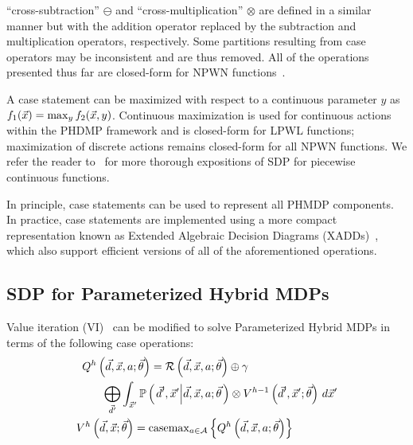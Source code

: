 ``cross-subtraction'' {\footnotesize$\ominus$} and ``cross-multiplication'' {\footnotesize$\otimes$} are defined in a similar manner but with the addition operator replaced by the subtraction and multiplication operators, respectively. Some partitions resulting from case operators may be inconsistent and are thus removed. All of the operations presented thus far are closed-form for NPWN functions~\cite{Sanner_UAI_2011}.

A case statement can be maximized with respect to a continuous parameter {\footnotesize$y$} as {\footnotesize $ f_1(\vec{x}) = \contmax_{y}f_2(\vec{x}, y) $}. Continuous maximization is used for continuous actions within the PHDMP framework and is closed-form for LPWL functions; maximization of discrete actions remains closed-form for all NPWN functions. We refer the reader to~\cite{Sanner_UAI_2011,Zamani_AAAI_2012} for more thorough expositions of SDP for piecewise continuous functions.

In principle, case statements can be used to represent all PHMDP components. In practice, case statements are implemented using a more compact representation known as Extended Algebraic Decision Diagrams (XADDs)~\cite{Sanner_UAI_2011}, which also support efficient versions of all of the aforementioned operations. 

\subsection{SDP for Parameterized Hybrid MDPs}

Value iteration (VI)~\cite{Bellman_PU_1957} can be modified to solve Parameterized Hybrid MDPs in terms of the following case operations:
{\footnotesize 
    \abovedisplayskip=0pt
    \belowdisplayskip=0pt
    \begin{align}
        Q^{h} \left( \vec{d}, \vec{x}, a; \vec{\theta} \right) = \mathcal{R} \left( \vec{d}, \vec{x}, a; \vec{\theta} \right) \oplus \gamma \qquad \qquad \qquad \qquad &  \nonumber \\ 
        \bigoplus_{\vec{d}'} \int_{\vec{x}'} \mathbb{P}\left({ \left. \vec{d}', \vec{x}' \middle| \vec{d}, \vec{x}, a; \vec{\theta} \right.}\right) \otimes V^{h-1} \left( \vec{d}', \vec{x}'; \vec{\theta} \right) \, d\vec{x}' & \label{eq:vi_sdp_qfunc} \\
        V^{h}\left( \vec{d}, \vec{x}; \vec{\theta} \right) = \mathrm{casemax}_{a \in \mathcal{A}} \left\{ Q^{h} \left( \vec{d}, \vec{x}, a; \vec{\theta} \right) \right\} \qquad \qquad & \label{eq:vi_sdp_vfunc}
    \end{align}
}%

